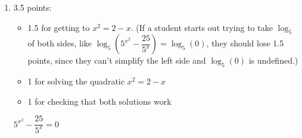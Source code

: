 \documentclass{article}
\begin{document}
\begin{enumerate}
\begin{enumerate}
    \begin{problem}[\vfill]
      $\ln x = 2 \ln(2 - x)$
    \end{problem}

    \begin{solution}
      \begin{align*}
        \ln x &= 2\ln(2-x) \\
        \ln x &= \ln[(2-x)^2] \\
        x &= (2-x)^2 \\
        x &= x^2 - 4x + 4 \\
        0 &= x^2 - 5x + 4 \\
        0 &= (x-1)(x-4) 
      \end{align*}
      This gives us $x=1$ and $x=4$. Plugging in $x=1$, we see 
      that it is a solution.
      \begin{align*}
        \ln 1 &= 2\ln(2-1)\\
        0 &= 0\ \text{\ding{51}}\\
        \intertext{Plugging in $x=4$, we see that it is extraneous.}
        \ln 4 &= 2\ln(2-4)\\
        \ln 4 &= 2 \ln(-2)\ \text{\ding{55}}
      \end{align*}
      So the only solution is $x=\boxed{1}$.
    \end{solution}

  \item

    \begin{grading}
      3.5 points:
      \begin{itemize}[nosep]
      \item 1.5 for getting to $x^2 = 2 - x$. (If a student starts out trying to take $\log_5$ of both sides, like $\log_5 \left( 5^{x^2} - \dfrac{25}{5^x} \right) = \log_5(0)$, they should lose 1.5 points, since they can't simplify the left side and $\log_5(0)$ is undefined.)
      \item 1 for solving the quadratic $x^2 = 2 - x$
      \item 1 for checking that both solutions work
      \end{itemize}
    \end{grading}

    \begin{problem}[\vfill\newpage]
      $5^{x^2} - \dfrac{25}{5^x} = 0$
    \end{problem}


\end{enumerate}
\end{enumerate}
\end{document}
